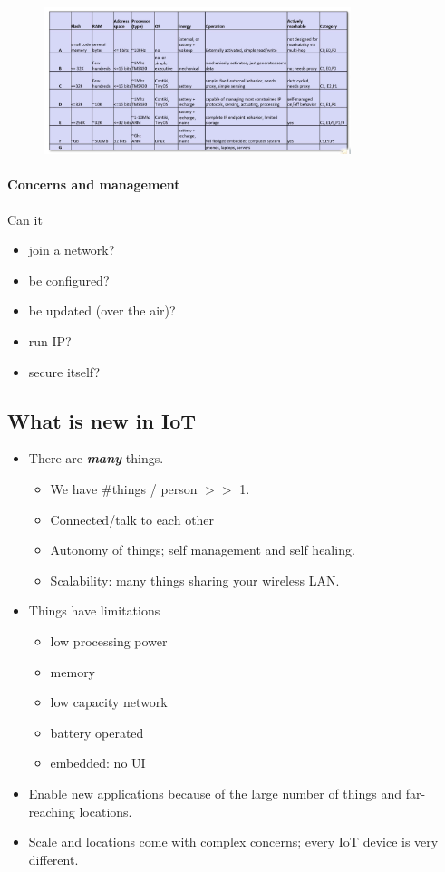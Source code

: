 \documentclass[11pt]{article}
\let\oldemph\emph
\renewcommand{\emph}[1]{\oldemph{\textbf{#1}}\marginpar{\textbf{#1}}}
\begin{document}
    \begin{figure}[H]
        \centering
        \includegraphics[width=0.8\textwidth]{img/paste-20201117124401.png}
    \end{figure}

    \paragraph{Concerns and management}
    Can it
    \begin{itemize}
        \item join a network?
        \item be configured?
        \item be updated (over the air)?
        \item run IP?
        \item secure itself?
    \end{itemize}

    \subsection{What is new in IoT}
    \begin{itemize}
        \item
        There are \emph{many} things.
        \begin{itemize}
            \item
            We have \#things / person $>>$ 1.
            \item Connected/talk to each other
            \item
            Autonomy of things;
            self management and self healing.
            \item
            Scalability: many things sharing your wireless LAN.
        \end{itemize}
        \item
        Things have limitations
        \begin{itemize}
            \item low processing power
            \item memory
            \item low capacity network
            \item battery operated
            \item embedded: no UI
        \end{itemize}
        \item
        Enable new applications because of the large number of things and far-reaching locations.
        \item
        Scale and locations come with complex concerns; every IoT device is very different.
    \end{itemize}
\end{document}
